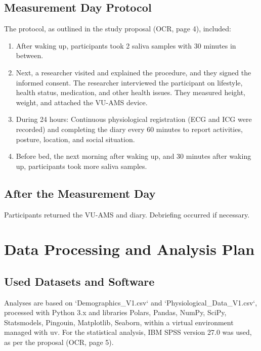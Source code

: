 \documentclass[11pt, a4paper]{report}
\begin{document}
\subsection{Measurement Day Protocol}
\label{subsec:proc_measurement_day} %
The protocol, as outlined in the study proposal \cite{ThesisTempPDF} (OCR, page 4), included:
\begin{enumerate}
    \item After waking up, participants took 2 saliva samples with 30 minutes in between.
    \item Next, a researcher visited and explained the procedure, and they signed the informed consent. The researcher interviewed the participant on lifestyle, health status, medication, and other health issues. They measured height, weight, and attached the VU-AMS device.
    \item During 24 hours: Continuous physiological registration (ECG and ICG were recorded) and completing the diary every 60 minutes to report activities, posture, location, and social situation.
    \item Before bed, the next morning after waking up, and 30 minutes after waking up, participants took more saliva samples.
\end{enumerate}

\subsection{After the Measurement Day}
\label{subsec:proc_after}
Participants returned the VU-AMS and diary. Debriefing occurred if necessary.

\section{Data Processing and Analysis Plan}
\label{sec:data_processing_analysis} %

\subsection{Used Datasets and Software}
\label{subsec:datasets_software_method} %
Analyses are based on `Demographics_V1.csv` and `Physiological_Data_V1.csv`, processed with Python 3.x and libraries Polars, Pandas, NumPy, SciPy, Statsmodels, Pingouin, Matplotlib, Seaborn, within a virtual environment managed with uv. For the statistical analysis, IBM SPSS version 27.0 was used, as per the proposal \cite{ThesisTempPDF} (OCR, page 5).
\end{document}
